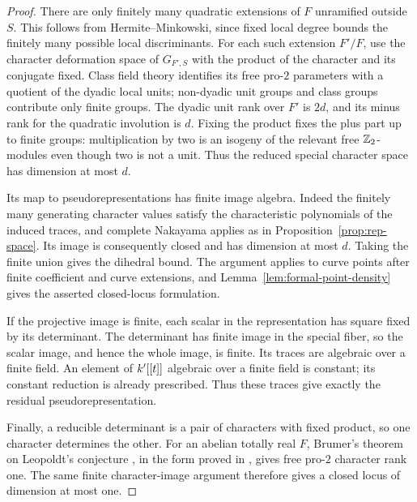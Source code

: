 \begin{proof}
There are only finitely many quadratic extensions of $F$ unramified
outside $S$.  This follows from Hermite--Minkowski, since fixed local
degree bounds the finitely many possible local discriminants.  For
each such extension $F'/F$, use the character deformation space of
$G_{F',S}$ with the product of the character and its conjugate fixed.
Class field theory identifies its free pro-$2$ parameters with a
quotient of the dyadic local units; non-dyadic unit groups and class
groups contribute only finite groups.  The dyadic unit rank over
$F'$ is $2d$, and its minus rank for the quadratic involution is
$d$.  Fixing the product fixes the plus part up to finite groups:
multiplication by two is an isogeny of the relevant free
$\mathbb Z_2$-modules even though two is not a unit.  Thus the reduced
special character space has dimension at most $d$.

Its map to pseudorepresentations has finite image algebra.  Indeed
the finitely many generating character values satisfy the
characteristic polynomials of the induced traces, and complete
Nakayama applies as in Proposition~\ref{prop:rep-space}.  Its image
is consequently closed and has dimension at most $d$.  Taking the
finite union gives the dihedral bound.  The argument applies to
curve points after finite coefficient and curve extensions, and
Lemma~\ref{lem:formal-point-density} gives the asserted closed-locus
formulation.

If the projective image is finite, each scalar in the representation
has square fixed by its determinant.  The determinant has finite
image in the special fiber, so the scalar image, and hence the whole
image, is finite.  Its traces are algebraic over a finite field.  An
element of $k'[[t]]$ algebraic over a finite field is constant;
its constant reduction is already prescribed.  Thus these traces
give exactly the residual pseudorepresentation.

Finally, a reducible determinant is a pair of characters with fixed
product, so one character determines the other.  For an abelian
totally real $F$, Brumer's theorem on Leopoldt's conjecture
\cite{Brumer1967}, in the form proved in
\cite[Theorem~1 and Proposition~8, pp.~9-08--9-09 and 9-14]{Fresnel1969},
gives free pro-$2$ character rank one.
The same finite character-image argument
therefore gives a closed locus of dimension at most one.
\end{proof}

